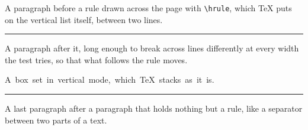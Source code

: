 \documentclass{article}
\begin{document}
A paragraph before a rule drawn across the page with \verb|\hrule|, which
TeX puts on the vertical list itself, between two lines.
\hrule
A paragraph after it, long enough to break across lines differently at
every width the test tries, so that what follows the rule moves.

\hbox{A box set in vertical mode, which TeX stacks as it is.}
\medskip
\noindent\rule{\textwidth}{0.4pt}

A last paragraph after a paragraph that holds nothing but a rule, like a
separator between two parts of a text.
\end{document}
